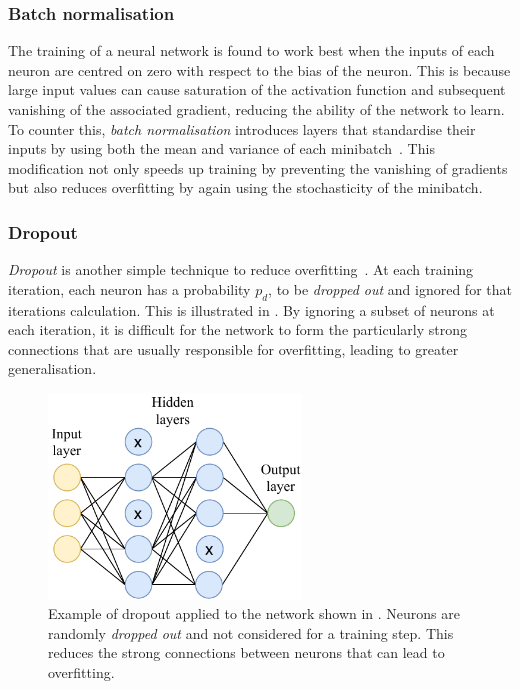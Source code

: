 \subsubsection*{Batch normalisation} %

The training of a neural network is found to work best when the inputs of each neuron are centred
on zero with respect to the bias of the neuron. This is because large input values can cause
saturation of the activation function and subsequent vanishing of the associated gradient,
reducing the ability of the network to learn. To counter this, \emph{batch normalisation}
introduces layers that standardise their inputs by using both the mean and variance of each
minibatch~\cite{ioffe2015}. This modification not only speeds up training by preventing the
vanishing of gradients but also reduces overfitting by again using the stochasticity of the
minibatch.

\subsubsection*{Dropout} %

\emph{Dropout} is another simple technique to reduce overfitting~\cite{hinton2012}. At each
training iteration, each neuron has a probability $p_{d}$, to be \emph{dropped out} and ignored
for that iterations calculation. This is illustrated in . By ignoring a
subset of neurons at each iteration, it is difficult for the network to form the particularly
strong connections that are usually responsible for overfitting, leading to greater
generalisation.

\begin{figure} %
    \includegraphics[width=0.6\textwidth]{diagrams/6-cnn/dropout.pdf}
    \caption[Example of dropout applied to a neural network]
    {Example of dropout applied to the network shown in . Neurons are
        randomly \emph{dropped out} and not considered for a training step. This reduces the
        strong connections between neurons that can lead to overfitting.}
    \label{fig:dropout}
\end{figure}

